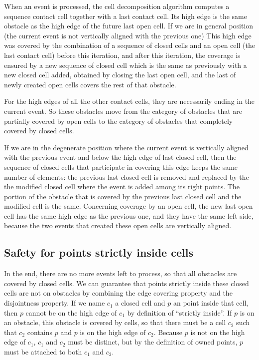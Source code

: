 \documentclass[a4paper, USenglish, cleveref, autoref, thm-restate]{lipics-v2021}
\begin{document}
When an event is processed, the cell decomposition algorithm computes
a sequence contact cell together with a last contact cell.  Its high edge
is the same obstacle as the high edge of the future last open cell.  If we
are in general position (the current event is not vertically aligned
with the previous one) This high
edge was covered by the combination of a sequence of closed cells and
an open cell (the last contact cell) before this iteration,
and after this iteration, the coverage is ensured by a new sequence
of closed cell which is the same as previously with a new closed cell added,
obtained by closing the last open cell, and the last of newly created open
cells covers the rest of that obstacle.

For the high edges of all the other contact cells, they are
necessarily ending in the current event.  So these obstacles move from
the category of obstacles that are partially covered by open cells to
the category of obstacles that completely covered by closed cells.

If we are in the degenerate position where the current event is
vertically aligned with the previous event and below the high edge of
last closed cell, then the sequence of closed cells that participate
in covering this edge keeps the same number of elements: the previous last
closed cell is removed and replaced by the the modified closed cell
where the event is added among its right points.  The portion of the
obstacle that is covered by the previous last closed cell and the
modified cell is the same.  Concerning coverage by an open cell, the
new last open cell has the same high edge as the previous one, and
they have the same left side, because the two events that created
these open cells are vertically aligned.
\subsection{Safety for points strictly inside cells}
In the end, there are no more events left to process, so that all
obstacles are covered by closed cells.  
We can guarantee that points strictly inside these closed cells are not
on obstacles by combining the edge covering property and the
disjointness property.  If we name \(c_1\) a closed cell and \(p\) an
point inside that cell, then \(p\) cannot be on the high edge of
\(c_1\) by definition of ``strictly inside''.  If \(p\) is on an
obstacle, this obstacle is covered by cells, so that there must be a
cell \(c_2\) such that \(c_2\) contains \(p\) and \(p\) is on the high
edge of \(c_2\).  Because \(p\) is not on the high edge of \(c_1\),
\(c_1\) and \(c_2\) must be distinct, but by the definition of
owned points, \(p\) must be attached to both \(c_1\) and \(c_2\).
\end{document}
